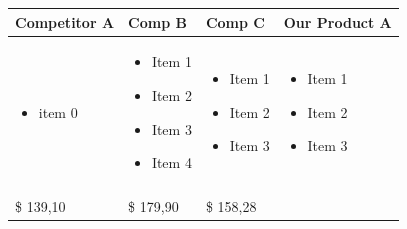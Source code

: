 \documentclass[11pt,a4paper,titlepage]{article}
\begin{document}
\begin{tabular}{| m{92 pt} | m{92 pt} | m{92 pt} | m{92 pt} |}
  Competitor A & Comp B & Comp C & Our Product A\\\hline
  \begin{itemize} \tiny \item  item 0 \end{itemize} & 
  \begin{itemize} \tiny 
  \item Item 1
  \item Item 2
  \item Item 3
  \item Item 4\end{itemize} & 
    \begin{itemize} \tiny 
    \item Item 1
    \item Item 2
    \item Item 3\end{itemize}& 
      \begin{itemize} \tiny 
      \item Item 1
      \item Item 2
      \item Item 3 \end{itemize} \\
      & & & \\ \hline
      \$ 139,10 & \$ 179,90 & \$ 158,28 & \\ \hline
\end{tabular}
\end{document}
